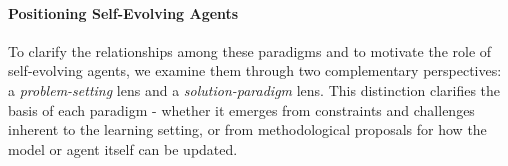 \documentclass[10pt]{article} %
\begin{document}
\begin{table}[t]
\small
\centering
\caption{Comparison between self-evolving agents and other renowned paradigms}
\label{tab:compare-paradigm}
\end{table}




\paragraph{Positioning Self-Evolving Agents}

To clarify the relationships among these paradigms and to motivate the role of self-evolving agents, we examine them through two complementary perspectives: a \emph{problem-setting} lens and a \emph{solution-paradigm} lens. This distinction clarifies the basis of each paradigm - whether it emerges from constraints and challenges inherent to the learning setting, or from methodological proposals for how the model or agent itself can be updated.
\end{document}

